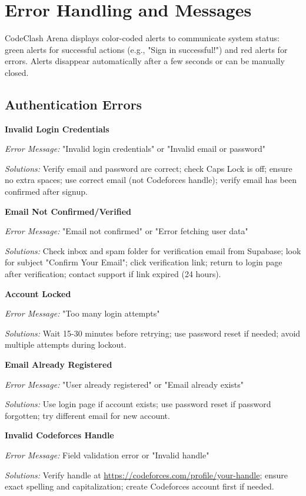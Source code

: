 \documentclass[12pt,a4paper]{article}
\begin{document}
\section{Error Handling and Messages}

CodeClash Arena displays color-coded alerts to communicate system status: green alerts for successful actions (e.g., "Sign in successful!") and red alerts for errors. Alerts disappear automatically after a few seconds or can be manually closed.

\subsection{Authentication Errors}

\textbf{Invalid Login Credentials}

\textit{Error Message:} "Invalid login credentials" or "Invalid email or password"

\textit{Solutions:} Verify email and password are correct; check Caps Lock is off; ensure no extra spaces; use correct email (not Codeforces handle); verify email has been confirmed after signup.

\textbf{Email Not Confirmed/Verified}

\textit{Error Message:} "Email not confirmed" or "Error fetching user data"

\textit{Solutions:} Check inbox and spam folder for verification email from Supabase; look for subject "Confirm Your Email"; click verification link; return to login page after verification; contact support if link expired (24 hours).

\textbf{Account Locked}

\textit{Error Message:} "Too many login attempts"

\textit{Solutions:} Wait 15-30 minutes before retrying; use password reset if needed; avoid multiple attempts during lockout.

\textbf{Email Already Registered}

\textit{Error Message:} "User already registered" or "Email already exists"

\textit{Solutions:} Use login page if account exists; use password reset if password forgotten; try different email for new account.

\textbf{Invalid Codeforces Handle}

\textit{Error Message:} Field validation error or "Invalid handle"

\textit{Solutions:} Verify handle at \url{https://codeforces.com/profile/your-handle}; ensure exact spelling and capitalization; create Codeforces account first if needed.
\end{document}
